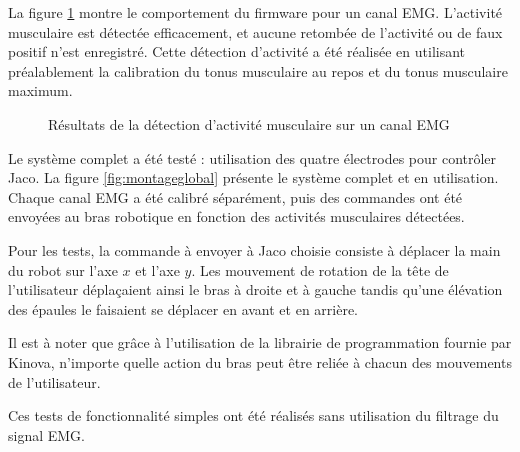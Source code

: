 \documentclass[letterpaper, twoside, 12pt, memoire, creativecommons, hyperref]{thETS}
\begin{document}
La figure \ref{fig:onset} montre le comportement du firmware pour un canal EMG. L'activité musculaire est détectée efficacement, et aucune retombée de l'activité ou de faux positif n'est enregistré. Cette détection d'activité a été réalisée en utilisant préalablement la calibration du tonus musculaire au repos et du tonus musculaire maximum. 

\begin{figure}
	\centering
	\caption{Résultats de la détection d'activité musculaire sur un canal EMG}
	\label{fig:onset}
\end{figure}

Le système complet a été testé : utilisation des quatre électrodes pour contrôler Jaco. La figure \ref{fig:montageglobal} présente le système complet et en utilisation. Chaque canal EMG a été calibré séparément, puis des commandes ont été envoyées au bras robotique en fonction des activités musculaires détectées. 

Pour les tests, la commande à envoyer à Jaco choisie consiste à déplacer la main du robot sur l'axe $x$ et l'axe $y$. Les mouvement de rotation de la tête de l'utilisateur déplaçaient ainsi le bras à droite et à gauche tandis qu'une élévation des épaules le faisaient se déplacer en avant et en arrière. 

Il est à noter que grâce à l'utilisation de la librairie de programmation fournie par Kinova, n'importe quelle action du bras peut être reliée à chacun des mouvements de l'utilisateur.

Ces tests de fonctionnalité simples ont été réalisés sans utilisation du filtrage du signal EMG.
\end{document}
